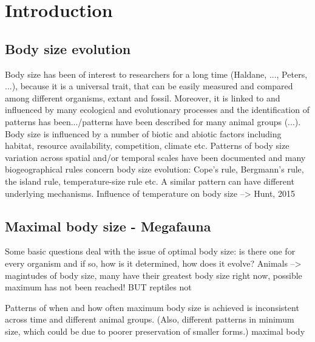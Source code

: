 \section{Introduction}
\subsection{Body size evolution}
Body size has been of interest to researchers for a long time (Haldane, ..., Peters, ...), because it is a universal trait, that can be easily measured and compared among different organisms, extant and fossil. Moreover, it is linked to and influenced by many ecological and evolutionary processes and the identification of patterns has been.../patterns have been described for many animal groups (...). Body size is influenced by a number of biotic and abiotic factors including habitat, resource availability, competition, climate etc.
Patterns of body size variation across spatial and/or temporal scales have been documented and many biogeographical rules concern body size evolution: Cope's rule, Bergmann's rule, the island rule, temperature-size rule etc.
A similar pattern can have different underlying mechanisms.
Influence of temperature on body size --> Hunt, 2015



\subsection{Maximal body size - Megafauna}
Some basic questions deal with the issue of optimal body size: is there one for every organism and if so, how is it determined, how does it evolve?
Animals --> magintudes of body size, many have their greatest body size right now, possible maximum has not been reached! BUT reptiles not

Patterns of when and how often maximum body size is achieved is inconsistent across time and different animal groups.
(Also, different patterns in minimum size, which could be due to poorer preservation of smaller forms.) maximal body

